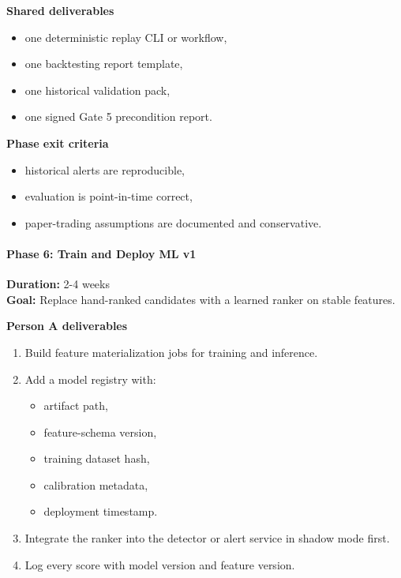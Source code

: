 \documentclass[
]{article}
\providecommand{\tightlist}{%
  \setlength{\itemsep}{0pt}\setlength{\parskip}{0pt}}
\begin{document}
\textbf{Shared deliverables}

\begin{itemize}
\tightlist
\item
  one deterministic replay CLI or workflow,
\item
  one backtesting report template,
\item
  one historical validation pack,
\item
  one signed Gate 5 precondition report.
\end{itemize}

\textbf{Phase exit criteria}

\begin{itemize}
\tightlist
\item
  historical alerts are reproducible,
\item
  evaluation is point-in-time correct,
\item
  paper-trading assumptions are documented and conservative.
\end{itemize}

\paragraph{Phase 6: Train and Deploy ML
v1}\label{phase-6-train-and-deploy-ml-v1}

\textbf{Duration:} 2-4 weeks\\
\textbf{Goal:} Replace hand-ranked candidates with a learned ranker on
stable features.

\textbf{Person A deliverables}

\begin{enumerate}
\def\labelenumi{\arabic{enumi}.}
\tightlist
\item
  Build feature materialization jobs for training and inference.
\item
  Add a model registry with:

  \begin{itemize}
  \tightlist
  \item
    artifact path,
  \item
    feature-schema version,
  \item
    training dataset hash,
  \item
    calibration metadata,
  \item
    deployment timestamp.
  \end{itemize}
\item
  Integrate the ranker into the detector or alert service in shadow mode
  first.
\item
  Log every score with model version and feature version.
\end{enumerate}
\end{document}
